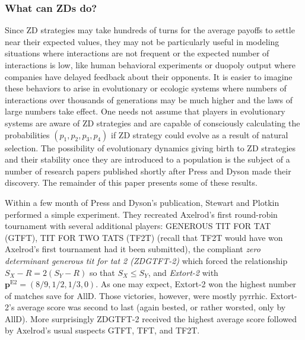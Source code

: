 \subsubsection{What can ZDs do?}

Since ZD strategies may take hundreds of turns for the average payoffs to settle near their expected values, they may not be particularly useful in modeling situations where interactions are not frequent or the expected number of interactions is low, like human behavioral experiments or duopoly output where companies have delayed feedback about their opponents. It is easier to imagine these behaviors to arise in evolutionary or ecologic systems where numbers of interactions over thousands of generations may be much higher and the laws of large numbers take effect. One needs not assume that players in evolutionary systems are aware of ZD strategies and are capable of consciously calculating the probabilities $(p_1, p_2, p_3, p_4)$ if ZD strategy could evolve as a result of natural selection. The possibility of evolutionary dynamics giving birth to ZD strategies and their stability once they are introduced to a population is the subject of a number of research papers published shortly after Press and Dyson made their discovery. The remainder of this paper presents some of these results.

Within a few month of Press and Dyson's publication, Stewart and Plotkin \cite{Stewart26062012} performed a simple experiment. They recreated Axelrod's first round-robin tournament with several additional players: GENEROUS TIT FOR TAT (GTFT), TIT FOR TWO TATS (TF2T) (recall that TF2T would have won Axelrod's first tournament had it been submitted), the compliant \textit{zero determinant generous tit for tat 2 (ZDGTFT-2)} which forced the relationship $S_X - R = 2(S_Y - R)$ so that $S_X \leq S_Y$, and \textit{Extort-2} with $\mathbf{p}^{\textrm{E2}} = (8/9, 1/2, 1/3, 0)$. As one may expect, Extort-2 won the highest number of matches save for AllD. Those victories, however, were mostly pyrrhic. Extort-2's average score was second to last (again bested, or rather worsted, only by AllD). More surprisingly ZDGTFT-2 received the highest average score followed by Axelrod's usual suspects GTFT, TFT, and TF2T. 

